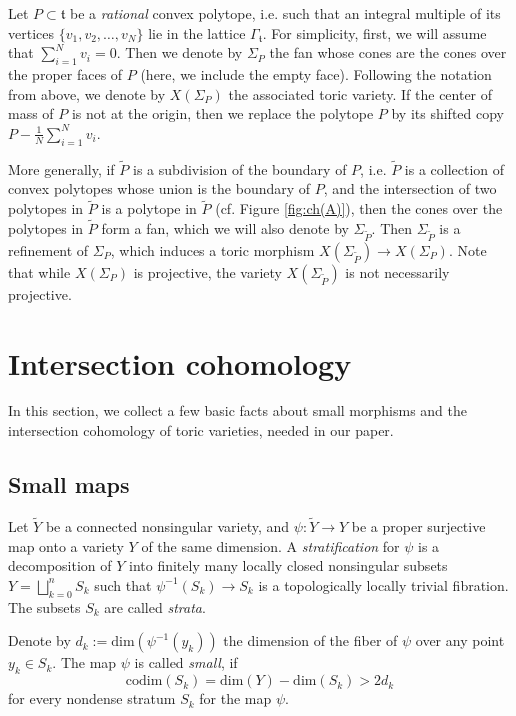 Let $P\subset\mathfrak{t}$ be a  \textit{rational} convex polytope, i.e.  
such that an integral multiple of its vertices $ \{v_1,v_2,\dots,v_N\} $ lie in 
the lattice $ \Gamma_\mathfrak{t} $. For simplicity, first, we will assume that $ 
\sum_{i=1}^{N}v_i=0 $. 
Then we denote by $\Sigma_P$ the fan whose cones are the cones over the proper
faces of $P$ (here, we include the empty face). Following the notation from above, we denote by $X(\Sigma_P)$ the associated toric variety. If the center of mass of $ P $ is not at the origin, then we replace the polytope $P$ by its shifted copy $P- 
\frac1N\sum_{i=1}^{N}v_i$. \label{projectivefan}

 More generally, if $\widetilde{P}$ is a subdivision of the boundary of $P$, 
 i.e.  $\widetilde{P}$ is a collection of convex polytopes whose union is the 
 boundary of $P$, and the intersection of two polytopes in $\widetilde{P}$ is a 
 polytope in $\widetilde{P}$ (cf.  Figure \ref{fig:ch(A)}), then the cones over 
 the polytopes in $\widetilde{P}$ form a fan, which we will also denote by 
 $\Sigma_{\widetilde{P}}$.
Then $\Sigma_{\widetilde{P}}$ is a refinement of $\Sigma_{{P}}$, which induces 
a toric morphism $X(\Sigma_{\widetilde{P}})\to X(\Sigma_{{P}})$.
Note that while $X(\Sigma_P)$ is projective, the variety $ 
X(\Sigma_{\widetilde{P}}) $ is not necessarily projective. 




\section{Intersection cohomology}\label{sec:intcoh}
In this section, we collect a few basic facts about small morphisms and the 
intersection cohomology of toric varieties, needed in our paper.  
\subsection{Small maps}\label{S3.1}


Let $ \widetilde{Y}$ be a connected nonsingular  
variety, and $\psi: \widetilde{Y}\to Y$ be a proper surjective map onto a 
variety $ Y $ of the same dimension. 
A \textit{stratification} for $\psi$  is a decomposition of $Y$ into finitely many 
locally closed nonsingular subsets $Y = \bigsqcup_{k=0}^n S_k$ such that 
$\psi^{-1}(S_k) \to S_k$ is a topologically locally trivial fibration. The subsets 
$S_k$ are called \textit{strata}.

 
Denote by $d_k:=\mathrm{dim}(\psi^{-1}(y_k))$ the dimension of the fiber of $ \psi $ 
over any point $y_k\in S_k$. The map $\psi$ is called \textit{small}, if
\begin{equation}\label{small}
\mathrm{codim}(S_k) =  \mathrm{dim}(Y) - \mathrm{dim}(S_k) > 2d_k
\end{equation}
 for every nondense stratum $ S_k $ for the map $\psi$. 

